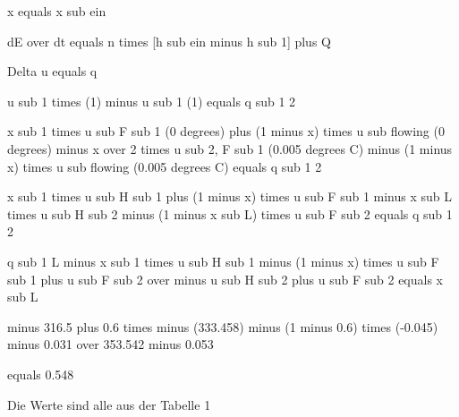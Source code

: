 x equals x sub ein

dE over dt equals n times [h sub ein minus h sub 1] plus Q

Delta u equals q

u sub 1 times (1) minus u sub 1 (1) equals q sub 1 2

x sub 1 times u sub F sub 1 (0 degrees) plus (1 minus x) times u sub flowing (0 degrees) minus x over 2 times u sub 2, F sub 1 (0.005 degrees C) minus (1 minus x) times u sub flowing (0.005 degrees C) equals q sub 1 2

x sub 1 times u sub H sub 1 plus (1 minus x) times u sub F sub 1 minus x sub L times u sub H sub 2 minus (1 minus x sub L) times u sub F sub 2 equals q sub 1 2

q sub 1 L minus x sub 1 times u sub H sub 1 minus (1 minus x) times u sub F sub 1 plus u sub F sub 2 over minus u sub H sub 2 plus u sub F sub 2 equals x sub L

minus 316.5 plus 0.6 times minus (333.458) minus (1 minus 0.6) times (-0.045) minus 0.031 over 353.542 minus 0.053

equals 0.548

Die Werte sind alle aus der Tabelle 1